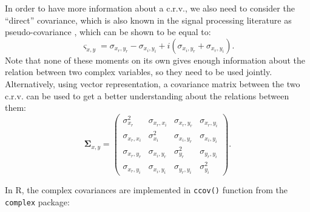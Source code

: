 \documentclass[
]{book}
\begin{document}
In order to have more information about a c.r.v., we also need to consider the ``direct'' covariance, which is also known in the signal processing literature as pseudo-covariance \citep[\citet{Gao2019}]{Neeser1993}, which can be shown to be equal to:
\begin{equation}
    \varsigma_{x,y} = \sigma_{x_r, y_r} - \sigma_{x_i, y_i} + i (\sigma_{x_i, y_r} + \sigma_{x_r, y_i}).
    \label{eq:crvMomentSecondPseudoCovarianceShort}
\end{equation}
Note that none of these moments on its own gives enough information about the relation between two complex variables, so they need to be used jointly. Alternatively, using vector representation, a covariance matrix between the two c.r.v. can be used to get a better understanding about the relations between them:
\begin{equation}
    \boldsymbol{\Sigma}_{x,y} =
        \begin{pmatrix}
            \sigma_{x_r}^2 & \sigma_{x_r, x_i} & \sigma_{x_r, y_r} & \sigma_{x_r, y_i} \\
            \sigma_{x_r, x_i} & \sigma_{x_i}^2 & \sigma_{x_i, y_r} & \sigma_{x_i, y_i} \\
            \sigma_{x_r, y_r} & \sigma_{x_i, y_r} & \sigma_{y_r}^2 & \sigma_{y_r, y_i} \\
            \sigma_{x_r, y_i} & \sigma_{x_i, y_i} & \sigma_{y_r, y_i} & \sigma_{y_i}^2
        \end{pmatrix} .
    \label{eq:crvMomentSecondCoVarianceMatrix}
\end{equation}

In R, the complex covariances are implemented in \texttt{ccov()} function from the \texttt{complex} package:
\end{document}
